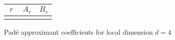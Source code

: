 \documentclass[11pt, oneside]{article}
\begin{document}
\newcommand{\dval}{4}    %
\newcommand{\ORDval}{34} %

\begin{center}
\renewcommand{\arraystretch}{1.2}
\begin{tabular}{|c|| c| c |} 
 \hline
  $\ r\ $ & $A_{r}$ & $B_{r}$  \\ [0.5ex] 
 \hline
%
\\[0.3ex]
 \hline
\end{tabular}

\bigskip

Pad\'e approximant coefficients for local dimension $d = \dval$
\end{center}
\end{document}
